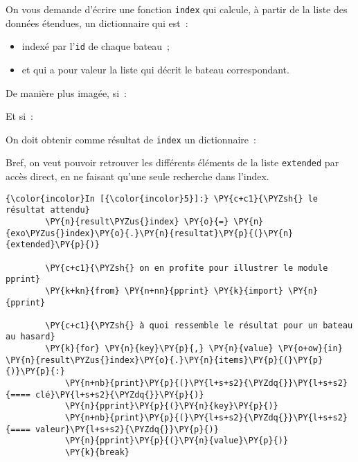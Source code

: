     On vous demande d'écrire une fonction \texttt{index} qui calcule, à
partir de la liste des données étendues, un dictionnaire qui est~:

\begin{itemize}
\tightlist
\item
  indexé par l'\texttt{id} de chaque bateau~;
\item
  et qui a pour valeur la liste qui décrit le bateau correspondant.
\end{itemize}

    De manière plus imagée, si~:

\begin{Shaded}
\begin{Highlighting}[]
\OperatorTok{=}
\end{Highlighting}
\end{Shaded}

Et si~:

\begin{Shaded}
\begin{Highlighting}[]
\OperatorTok{=}\NormalTok{ [ id1, latitude, ... ]}
\end{Highlighting}
\end{Shaded}

On doit obtenir comme résultat de \texttt{index} un dictionnaire~:

\begin{Shaded}
\begin{Highlighting}[]
\NormalTok{\{}
\OperatorTok{->}
\NormalTok{\}}
\end{Highlighting}
\end{Shaded}

Bref, on veut pouvoir retrouver les différents éléments de la liste
\texttt{extended} par accès direct, en ne faisant qu'une seule recherche
dans l'index.

    \begin{Verbatim}[commandchars=\\\{\}]
{\color{incolor}In [{\color{incolor}5}]:} \PY{c+c1}{\PYZsh{} le résultat attendu}
        \PY{n}{result\PYZus{}index} \PY{o}{=} \PY{n}{exo\PYZus{}index}\PY{o}{.}\PY{n}{resultat}\PY{p}{(}\PY{n}{extended}\PY{p}{)}
        
        \PY{c+c1}{\PYZsh{} on en profite pour illustrer le module pprint}
        \PY{k+kn}{from} \PY{n+nn}{pprint} \PY{k}{import} \PY{n}{pprint}
        
        \PY{c+c1}{\PYZsh{} à quoi ressemble le résultat pour un bateau au hasard}
        \PY{k}{for} \PY{n}{key}\PY{p}{,} \PY{n}{value} \PY{o+ow}{in} \PY{n}{result\PYZus{}index}\PY{o}{.}\PY{n}{items}\PY{p}{(}\PY{p}{)}\PY{p}{:}
            \PY{n+nb}{print}\PY{p}{(}\PY{l+s+s2}{\PYZdq{}}\PY{l+s+s2}{==== clé}\PY{l+s+s2}{\PYZdq{}}\PY{p}{)}
            \PY{n}{pprint}\PY{p}{(}\PY{n}{key}\PY{p}{)}
            \PY{n+nb}{print}\PY{p}{(}\PY{l+s+s2}{\PYZdq{}}\PY{l+s+s2}{==== valeur}\PY{l+s+s2}{\PYZdq{}}\PY{p}{)}
            \PY{n}{pprint}\PY{p}{(}\PY{n}{value}\PY{p}{)}
            \PY{k}{break}
\end{Verbatim}



